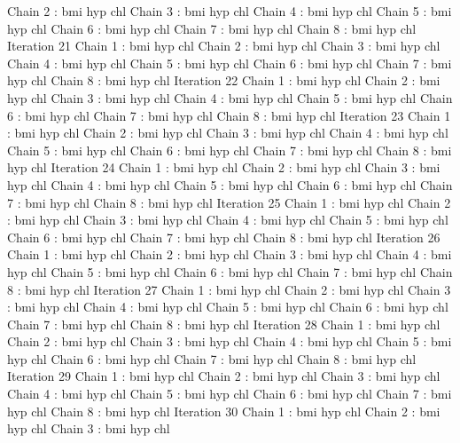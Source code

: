 \begin{Schunk}
\begin{Soutput}
 Chain 2 : bmi   hyp   chl   
 Chain 3 : bmi   hyp   chl   
 Chain 4 : bmi   hyp   chl   
 Chain 5 : bmi   hyp   chl   
 Chain 6 : bmi   hyp   chl   
 Chain 7 : bmi   hyp   chl   
 Chain 8 : bmi   hyp   chl   
Iteration 21 
 Chain 1 : bmi   hyp   chl   
 Chain 2 : bmi   hyp   chl   
 Chain 3 : bmi   hyp   chl   
 Chain 4 : bmi   hyp   chl   
 Chain 5 : bmi   hyp   chl   
 Chain 6 : bmi   hyp   chl   
 Chain 7 : bmi   hyp   chl   
 Chain 8 : bmi   hyp   chl   
Iteration 22 
 Chain 1 : bmi   hyp   chl   
 Chain 2 : bmi   hyp   chl   
 Chain 3 : bmi   hyp   chl   
 Chain 4 : bmi   hyp   chl   
 Chain 5 : bmi   hyp   chl   
 Chain 6 : bmi   hyp   chl   
 Chain 7 : bmi   hyp   chl   
 Chain 8 : bmi   hyp   chl   
Iteration 23 
 Chain 1 : bmi   hyp   chl   
 Chain 2 : bmi   hyp   chl   
 Chain 3 : bmi   hyp   chl   
 Chain 4 : bmi   hyp   chl   
 Chain 5 : bmi   hyp   chl   
 Chain 6 : bmi   hyp   chl   
 Chain 7 : bmi   hyp   chl   
 Chain 8 : bmi   hyp   chl   
Iteration 24 
 Chain 1 : bmi   hyp   chl   
 Chain 2 : bmi   hyp   chl   
 Chain 3 : bmi   hyp   chl   
 Chain 4 : bmi   hyp   chl   
 Chain 5 : bmi   hyp   chl   
 Chain 6 : bmi   hyp   chl   
 Chain 7 : bmi   hyp   chl   
 Chain 8 : bmi   hyp   chl   
Iteration 25 
 Chain 1 : bmi   hyp   chl   
 Chain 2 : bmi   hyp   chl   
 Chain 3 : bmi   hyp   chl   
 Chain 4 : bmi   hyp   chl   
 Chain 5 : bmi   hyp   chl   
 Chain 6 : bmi   hyp   chl   
 Chain 7 : bmi   hyp   chl   
 Chain 8 : bmi   hyp   chl   
Iteration 26 
 Chain 1 : bmi   hyp   chl   
 Chain 2 : bmi   hyp   chl   
 Chain 3 : bmi   hyp   chl   
 Chain 4 : bmi   hyp   chl   
 Chain 5 : bmi   hyp   chl   
 Chain 6 : bmi   hyp   chl   
 Chain 7 : bmi   hyp   chl   
 Chain 8 : bmi   hyp   chl   
Iteration 27 
 Chain 1 : bmi   hyp   chl   
 Chain 2 : bmi   hyp   chl   
 Chain 3 : bmi   hyp   chl   
 Chain 4 : bmi   hyp   chl   
 Chain 5 : bmi   hyp   chl   
 Chain 6 : bmi   hyp   chl   
 Chain 7 : bmi   hyp   chl   
 Chain 8 : bmi   hyp   chl   
Iteration 28 
 Chain 1 : bmi   hyp   chl   
 Chain 2 : bmi   hyp   chl   
 Chain 3 : bmi   hyp   chl   
 Chain 4 : bmi   hyp   chl   
 Chain 5 : bmi   hyp   chl   
 Chain 6 : bmi   hyp   chl   
 Chain 7 : bmi   hyp   chl   
 Chain 8 : bmi   hyp   chl   
Iteration 29 
 Chain 1 : bmi   hyp   chl   
 Chain 2 : bmi   hyp   chl   
 Chain 3 : bmi   hyp   chl   
 Chain 4 : bmi   hyp   chl   
 Chain 5 : bmi   hyp   chl   
 Chain 6 : bmi   hyp   chl   
 Chain 7 : bmi   hyp   chl   
 Chain 8 : bmi   hyp   chl   
Iteration 30 
 Chain 1 : bmi   hyp   chl   
 Chain 2 : bmi   hyp   chl   
 Chain 3 : bmi   hyp   chl   

\end{Soutput}
\end{Schunk}
